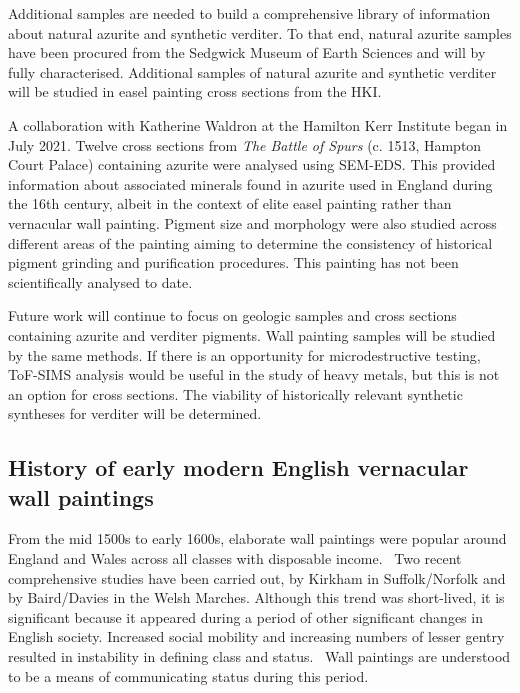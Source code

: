 Additional samples are needed to build a comprehensive library of information about natural azurite and synthetic verditer. To that end, natural azurite samples have been procured from the Sedgwick Museum of Earth Sciences and will by fully characterised. Additional samples of natural azurite and synthetic verditer will be studied in easel painting cross sections from the HKI.

A collaboration with Katherine Waldron at the Hamilton Kerr Institute began in July 2021. Twelve cross sections from \textit{The Battle of Spurs} (c. 1513, Hampton Court Palace) containing azurite were analysed using SEM-EDS. This provided information about associated minerals found in azurite used in England during the 16th century, albeit in the context of elite easel painting rather than vernacular wall painting. Pigment size and morphology were also studied across different areas of the painting aiming to determine the consistency of historical pigment grinding and purification procedures. This painting has not been scientifically analysed to date.

Future work will continue to focus on geologic samples and cross sections containing azurite and verditer pigments. Wall painting samples will be studied by the same methods. If there is an opportunity for microdestructive testing, ToF-SIMS analysis would be useful in the study of heavy metals, but this is not an option for cross sections. The viability of historically relevant synthetic syntheses for verditer will be determined.

\subsection[History of early modern English wall paintings]{History of early modern English vernacular wall paintings}
\label{subsection1.1.2}

From the mid 1500s to early 1600s, elaborate wall paintings were popular around England and Wales across all classes with disposable income.~\autocite{Baird_thesis,Davies_book,Kirkham_thesis} Two recent comprehensive studies have been carried out, by Kirkham in Suffolk/Norfolk and by Baird/Davies in the Welsh Marches. Although this trend was short-lived, it is significant because it appeared during a period of other significant changes in English society. Increased social mobility and increasing numbers of lesser gentry resulted in instability in defining class and status.~\autocite{Baird_thesis,Hamling_book} Wall paintings are understood to be a means of communicating status during this period.~\autocite{Baird_thesis,Davies_book,Kirkham_thesis}


